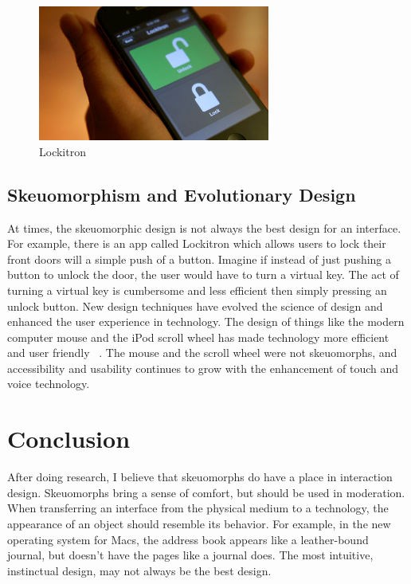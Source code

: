 \documentclass{article}
\begin{document}
\begin{figure}
\centering
\includegraphics[width=3in]{lockitron.jpeg} 

\caption{Lockitron}
\label{Lockitron Smartphone App}
\end{figure}
\subsection{Skeuomorphism and Evolutionary Design}

At times, the skeuomorphic design is not always the best design for an interface. For example, there is an app called Lockitron which allows users to lock their front doors will a simple push of a button. Imagine if instead of just pushing a button to unlock the door, the user would have to turn a virtual key. The act of turning a virtual key is cumbersome and less efficient then simply pressing an unlock button. New design techniques have evolved the science of design and enhanced the user experience in technology. The design of things like the modern computer mouse and the iPod scroll wheel has made technology more efficient and user friendly ~\cite{ipod}. The mouse and the scroll wheel were not skeuomorphs, and accessibility and usability continues to grow with the enhancement of touch and voice technology. 



\section{Conclusion}

	After doing research, I believe that skeuomorphs do have a place in interaction design. Skeuomorphs bring a sense of comfort, but should be used in moderation. When transferring an interface from the physical medium to a technology, the appearance of an object should resemble its behavior. For example, in the new operating system for Macs, the address book appears like a leather-bound journal, but doesn’t have the pages like a journal does. The most intuitive, instinctual design, may not always be the best design.
\pagebreak


\end{document}
